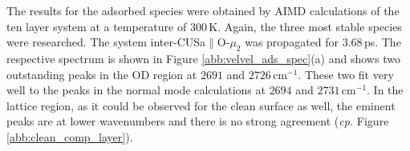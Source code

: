 \documentclass[11pt,DIV=13,BCOR=5mm,a4paper,headinclude]{scrbook}
\begin{document}
The results for the adsorbed species were obtained by AIMD calculations of the ten layer system at a temperature of $300\,$K.
Again, the three most stable species were researched.
The system inter-CUSa$\parallel$O-$\mu_2$ was propagated for $3.68\,$ps.
The respective spectrum is shown in Figure \ref{abb:velvel_ads_spec}(a) and shows two outstanding peaks in the OD region at $2691$ and $2726\,$cm$^{-1}$.
These two fit very well to the peaks in the normal mode calculations at $2694$ and $2731\,$cm$^{-1}$.
In the lattice region, as it could be observed for the clean surface as well, the eminent peaks are at lower wavenumbers and there is no strong agreement (\textit{cp.} Figure \ref{abb:clean_comp_layer}).
\begin{figure}[!h]
    \centering

\end{figure}
\end{document}
